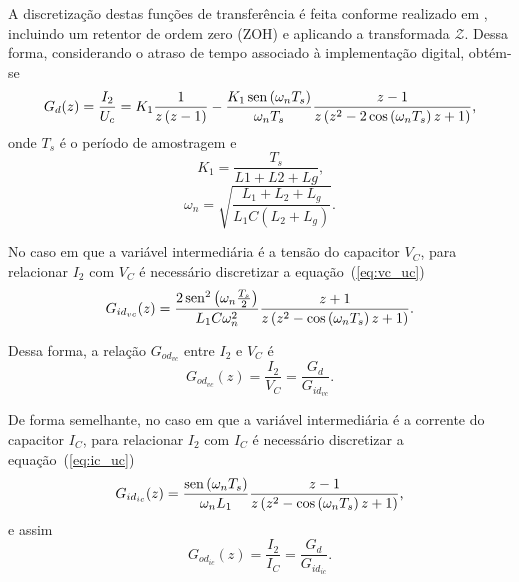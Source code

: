   A discretização destas funções de transferência é feita conforme realizado em \cite{ref:PARKER}, incluindo um retentor de ordem zero (ZOH) e aplicando a transformada $\mathcal{Z}$. Dessa forma, considerando o atraso de tempo associado à implementação digital, obtém-se
  \begin{equation}
    G_d (z) = \frac{I_2}{U_c} = K_1 \frac{1}{z \left( z-1 \right)}
    - \frac{K_1 \operatorname{sen} \left( \omega_n T_s \right) }{\omega_n T_s}
    \frac{z-1}{z \left( z^2 - 2 \cos\left( \omega_n T_s \right) z +1 \right) }
    \text{,}
  \end{equation}
  onde $T_s$ é o período de amostragem e
  \begin{equation}
    K_1 = \frac{T_s}{L1 + L2 + Lg} \text{,}
  \end{equation}
  \begin{equation}
    \omega_n = \sqrt{\frac{ L_1 + L_2 + L_g }{ L_1 C \left( L_2 + L_g \right)}}
    \text{.}
  \end{equation}

  No caso em que a variável intermediária é a tensão do capacitor $V_C$, para relacionar $I_2$ com $V_C$ é necessário discretizar a equação~(\ref{eq:vc_uc})
  \begin{equation}
    G_{id_{vc}}(z) = \frac{2 \operatorname{sen}^2 \left( \omega_n \frac{T_s}{2} \right)}{L_1 C \omega_n^2}
      \frac{z+1}{z \left( z^2 - \cos \left( \omega_n T_s \right) z + 1 \right)}
      \text{.}
  \end{equation}

  Dessa forma, a relação $G_{od_{vc}}$ entre $I_2$ e $V_C$ é
  \begin{equation}
    G_{od_{vc}}(z) = \frac{I_2}{V_C} = \frac{G_d}{G_{id_{vc}}} \text{.}
    \label{eq:god_i2_vc}
  \end{equation}

  De forma semelhante, no caso em que a variável intermediária é a corrente do capacitor $I_C$, para relacionar $I_2$ com $I_C$ é necessário discretizar a equação~(\ref{eq:ic_uc})
  \begin{equation}
    G_{id_{ic}}(z) = \frac{\operatorname{sen} \left( \omega_n T_s \right)}{\omega_n L_1}
      \frac{z-1}{z \left( z^2 - \cos \left( \omega_n T_s \right) z + 1 \right)}
      \text{,}
  \end{equation}
  e assim
  \begin{equation}
    G_{od_{ic}}(z) = \frac{I_2}{I_C} = \frac{G_d}{G_{id_{ic}}} \text{.}
    \label{eq:god_i2_ic}
  \end{equation}

